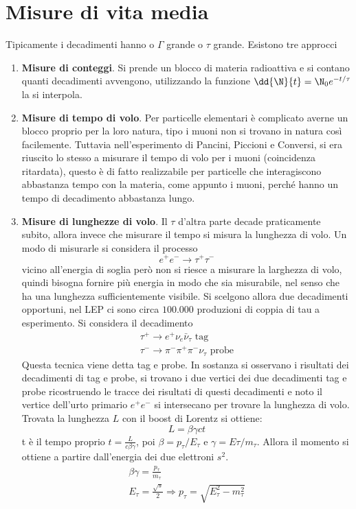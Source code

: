 \documentclass[12pt]{book}
\begin{document}
\section{Misure di vita media}
Tipicamente i decadimenti hanno o $\Gamma$ grande o $\tau$ grande. Esistono tre approcci
\begin{enumerate}
	\item \textbf{Misure di conteggi}. Si prende un blocco di materia radioattiva e si contano quanti decadimenti avvengono, utilizzando la funzione $\dd{\N}{t} = \N_0 e^{-t/\tau}$ la si interpola. 
	
	\item \textbf{Misure di tempo di volo}. Per particelle elementari è complicato averne un blocco proprio per la loro natura, tipo i muoni non si trovano in natura così facilemente. Tuttavia nell'esperimento di Pancini, Piccioni e Conversi, si era riuscito lo stesso a misurare il tempo di volo per i muoni (coincidenza ritardata), questo è di fatto realizzabile per particelle che interagiscono abbastanza tempo con la materia, come appunto i muoni, perché hanno un tempo di decadimento abbastanza lungo. 
	
	\item \textbf{Misure di lunghezze di volo}. Il $\tau$ d'altra parte decade praticamente subito, allora invece che misurare il tempo si misura la lunghezza di volo. Un modo di misurarle si considera il processo
	\begin{equation}
		e^+ e^- \rightarrow \tau^+ \tau^-
	\end{equation}
	vicino all'energia di soglia però non si riesce a misurare la larghezza di volo, quindi bisogna fornire più energia in modo che sia misurabile, nel senso che ha una lunghezza sufficientemente visibile. Si scelgono allora due decadimenti opportuni, nel LEP ci sono circa $100.000$ produzioni di coppia di tau a esperimento. Si considera il decadimento
	\begin{gather}
		\tau^+ \rightarrow e^+ \nu_e \bar \nu_\tau \text{ tag}\\
		\tau^- \rightarrow \pi^- \pi^+ \pi^- \nu_\tau \text{ probe}
	\end{gather}
	Questa tecnica viene detta tag e probe. In sostanza si osservano i risultati dei decadimenti di tag e probe, si trovano i due vertici dei due decadimenti tag e probe ricostruendo le tracce dei risultati di questi decadimenti e noto il vertice dell'urto primario $e^+e^-$ si intersecano per trovare la lunghezza di volo. Trovata la lunghezza $L$ con il boost di Lorentz si ottiene:
	\begin{equation}
		L= \beta \gamma c t
	\end{equation}
	t è il tempo proprio $t= \frac{L}{c \beta \gamma}$, poi $\beta = p_\tau / E_\tau$ e $\gamma = E\tau / m_\tau$. Allora il momento si ottiene a partire dall'energia dei due elettroni $s^2$.
	\begin{gather}
		\beta \gamma = \frac{p_\tau}{m_\tau}\\
		E_\tau = \frac{\sqrt{s}}{2} \Rightarrow p_\tau = \sqrt{E_\tau^2 - m_\tau^2}
	\end{gather}
\end{enumerate}
\end{document}
